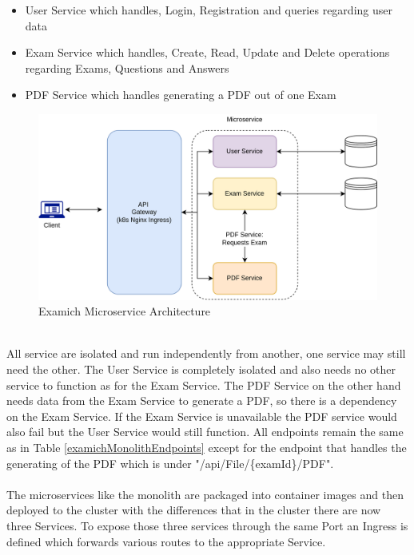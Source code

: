 \documentclass[BIF,Bachelor,nenglish]{twbook}%
\begin{document}
\begin{itemize}
\item User Service which handles, Login, Registration and queries regarding user data
\item Exam Service which handles, Create, Read, Update and Delete operations regarding Exams, Questions and Answers
\item PDF Service which handles generating a PDF out of one Exam
\end{itemize}
\begin{figure} [H]
 \begin{center}
    \includegraphics[width=1\linewidth]{img/ExamichMicroserviceArchitecture.png}
 \end{center}
 \caption{Examich Microservice Architecture}
 \label{examichMicroservice}
\end{figure}
\noindent
\\
All service are isolated and run independently from another, one service may still need the other. The User Service is completely isolated and also needs no other service to function as for the Exam Service. The PDF Service on the other hand needs data from the Exam Service to generate a PDF, so there is a dependency on the Exam Service. If the Exam Service is unavailable the PDF service would also fail but the User Service would still function. All endpoints remain the same as in Table \ref{examichMonolithEndpoints} except for the endpoint that handles the generating of the PDF which is under "/api/File/\{examId\}/PDF".
\\
\\
\noindent
The microservices like the monolith are packaged into container images and then deployed to the cluster with the differences that in the cluster there are now three Services. To expose those three services through the same Port  an Ingress is defined which forwards various routes to the appropriate Service.
\end{document}
